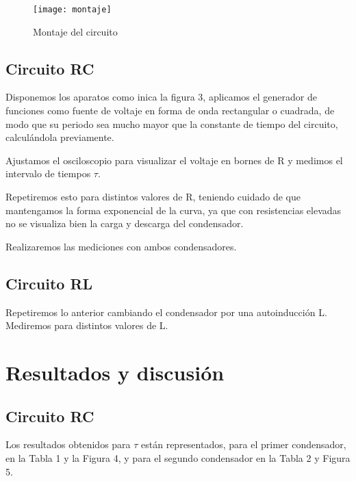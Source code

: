 \documentclass[a4paper,12pt,spanish]{article}
\begin{document}
\begin{figure}[H]
	\centering
	\texttt{[image: montaje]}
	\caption{Montaje del circuito}
	\label{fig:montaje}
\end{figure}

\subsection*{Circuito RC}

Disponemos los aparatos como inica la figura 3, aplicamos el generador de funciones como fuente de voltaje en forma de onda rectangular o cuadrada, de modo que su periodo sea mucho mayor que la constante de tiempo del circuito, calculándola previamente.

Ajustamos el osciloscopio para visualizar el voltaje en bornes de R y medimos el intervalo de tiempos $\tau$.

Repetiremos esto para distintos valores de R, teniendo cuidado de que mantengamos la forma exponencial de la curva, ya que con resistencias elevadas no se visualiza bien la carga y descarga del condensador.

Realizaremos las mediciones con ambos condensadores.


\subsection*{Circuito RL}

Repetiremos lo anterior cambiando el condensador por una autoinducción L. Mediremos para distintos valores de L.



\section{Resultados y discusión}

\subsection*{Circuito RC}

Los resultados obtenidos para $\tau$ están representados, para el primer condensador, en la Tabla 1 y la Figura 4, y para el segundo condensador en la Tabla 2 y Figura 5.
\end{document}
